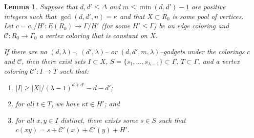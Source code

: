 \documentclass{article}
\newcommand{\cC}{\mathcal{C} }
\newtheorem{lemma}[theorem]{Lemma}
\theoremstyle{definition}
\begin{document}
\begin{lemma}\label{core_phase_arg}
    Suppose that $d, d'\leq\Delta$ and $m\leq \min(d, d')-1$ are positive integers such that $\gcd(d, d', n)=\kappa$ and that   
    $X\subset R_0$ is some pool of vertices. Let $c=c_1/H':E(R_0)\to \Gamma/H'$ (for some $H'\leqslant \Gamma$) be an edge coloring and $\cC:R_0\to \Gamma_0$ a vertex coloring that is constant on $X$. 
    
    If there are no $(d,\lambda)$--, $(d',\lambda)$-- or $(d,d',m,\lambda)$--gadgets under the colorings $c$ and $\cC$, then there exist sets $I\subset X$, $S=\{s_1,\ldots,s_{\lambda-1}\}\subset \Gamma$, $T\subset \Gamma$, and a vertex coloring $\cC':I\to T$ such that: 
    \begin{enumerate}
        \item $|I|\geq |X|/(\lambda-1)^{d+d'} - d-d'$;
        \item for all $t\in T$, we have $\kappa t \in H'$; and
        \item for all $x,y\in I$ distinct, there exists some $s\in S$ such that $c(xy)=s+\cC'(x)+\cC'(y)+H'$.
    \end{enumerate}  
\end{lemma}
\end{document}
